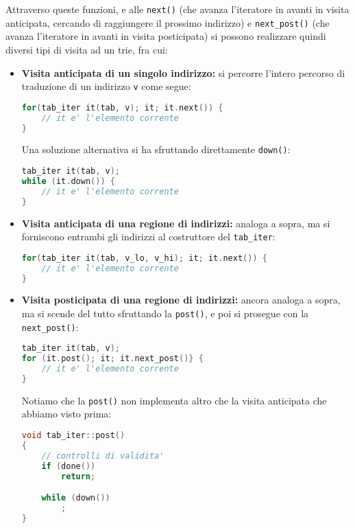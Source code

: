 \documentclass[a4paper,11pt]{article}
\begin{document}
Attraverso queste funzioni, e alle \lstinline|next()| (che avanza l'iteratore in avanti in visita anticipata, cercando di raggiungere il prossimo indirizzo) e \lstinline|next_post()| (che avanza l'iteratore in avanti in visita posticipata) si possono realizzare quindi diversi tipi di visita ad un trie, fra cui:
\begin{itemize}
	\item \textbf{Visita anticipata di un singolo indirizzo:} si percorre l'intero percorso di traduzione di un indirizzo \lstinline|v| come segue:
\begin{lstlisting}[language=C++, style=codestyle]	
for(tab_iter it(tab, v); it; it.next()) {
	// it e' l'elemento corrente
}
\end{lstlisting}

Una soluzione alternativa si ha sfruttando direttamente \lstinline|down()|:
\begin{lstlisting}[language=C++, style=codestyle]	
tab_iter it(tab, v);
while (it.down()) {
	// it e' l'elemento corrente
}
\end{lstlisting}

	\item \textbf{Visita anticipata di una regione di indirizzi:} analoga a sopra, ma si forniscono entrambi gli indirizzi al costruttore del \lstinline|tab_iter|: 
\begin{lstlisting}[language=C++, style=codestyle]	
for(tab_iter it(tab, v_lo, v_hi); it; it.next()) {
	// it e' l'elemento corrente
}
\end{lstlisting}
	
	\item \textbf{Visita posticipata di una regione di indirizzi:} ancora analoga a sopra, ma si scende del tutto sfruttando la \lstinline|post()|, e poi si prosegue con la \lstinline|next_post()|: 
\begin{lstlisting}[language=C++, style=codestyle]	
tab_iter it(tab, v);
for (it.post(); it; it.next_post()} {
	// it e' l'elemento corrente
}
\end{lstlisting}

Notiamo che la \lstinline|post()| non implementa altro che la visita anticipata che abbiamo visto prima:
\begin{lstlisting}[language=C++, style=codestyle]	
void tab_iter::post()
{
	// controlli di validita'
	if (done())
		return;

	while (down())
		;
}
\end{lstlisting}

\end{itemize}
\end{document}
